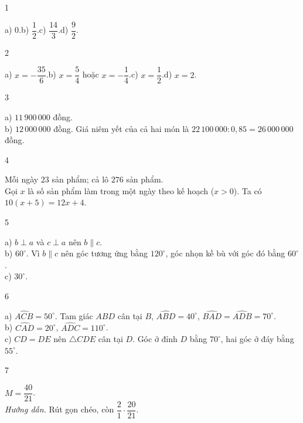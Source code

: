 \begin{Solbook}{1}
 \par \noindent  a) $0$.\quad b) $\dfrac {1}{2}$.\quad c) $\dfrac {14}{3}$.\quad d) $\dfrac {9}{2}$.  \hfill \qedEX 
\end{Solbook}
\begin{Solbook}{2}
 \par \noindent  a) $x=-\dfrac {35}{6}$.\quad b) $x=\dfrac {5}{4}$ hoặc $x=-\dfrac {1}{4}$.\quad c) $x=\dfrac {1}{2}$.\quad d) $x=2$.  \hfill \qedEX 
\end{Solbook}
\begin{Solbook}{3}
 \par \noindent  a) $11\,900\,000$ đồng.\\ b) $12\,000\,000$ đồng. Giá niêm yết của cả hai món là $22\,100\,000:0{,}85=26\,000\,000$ đồng.  \hfill \qedEX 
\end{Solbook}
\begin{Solbook}{4}
 \par \noindent  Mỗi ngày $23$ sản phẩm; cả lô $276$ sản phẩm.\\ Gọi $x$ là số sản phẩm làm trong một ngày theo kế hoạch ($x>0$). Ta có $10(x+5)=12x+4$.  \hfill \qedEX 
\end{Solbook}
\begin{Solbook}{5}
 \par \noindent  a) $b\perp a$ và $c\perp a$ nên $b\parallel c$.\\ b) $60^{\circ }$. Vì $b\parallel c$ nên góc tương ứng bằng $120^{\circ }$, góc nhọn kề bù với góc đó bằng $60^{\circ }$.\\ c) $30^{\circ }$.  \hfill \qedEX 
\end{Solbook}
\begin{Solbook}{6}
 \par \noindent  a) $\widehat {ACB}=50^{\circ }$. Tam giác $ABD$ cân tại $B$, $\widehat {ABD}=40^{\circ }$, $\widehat {BAD}=\widehat {ADB}=70^{\circ }$.\\ b) $\widehat {CAD}=20^{\circ }$, $\widehat {ADC}=110^{\circ }$.\\ c) $CD=DE$ nên $\triangle CDE$ cân tại $D$. Góc ở đỉnh $D$ bằng $70^{\circ }$, hai góc ở đáy bằng $55^{\circ }$.  \hfill \qedEX 
\end{Solbook}
\begin{Solbook}{7}
 \par \noindent  $M=\dfrac {40}{21}$.\\ \textit {Hướng dẫn.} Rút gọn chéo, còn $\dfrac {2}{1}\cdot \dfrac {20}{21}$.  \hfill \qedEX 
\end{Solbook}
